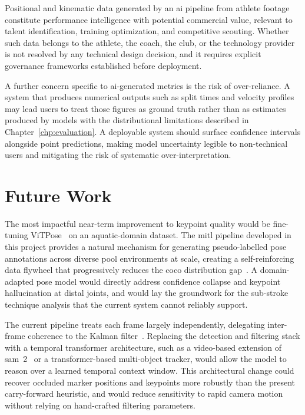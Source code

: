 Positional and kinematic data generated by an \gls{ai} pipeline from athlete footage constitute
performance intelligence with potential commercial value, relevant to talent identification,
training optimization, and competitive scouting. Whether such data belongs to the athlete, the
coach, the club, or the technology provider is not resolved by any technical design decision, and
it requires explicit governance frameworks established before deployment.

A further concern specific to \gls{ai}-generated metrics is the risk of over-reliance. A system
that produces numerical outputs such as split times and velocity profiles may lead users to
treat those figures as ground truth rather than as estimates produced by models with the
distributional limitations described in Chapter~\ref{chp:evaluation}. A deployable system
should surface confidence intervals alongside point predictions, making model uncertainty
legible to non-technical users and mitigating the risk of systematic over-interpretation.

\section{Future Work}

The most impactful near-term improvement to keypoint quality would be fine-tuning
ViTPose~\cite{xu2022vitpose} on an aquatic-domain dataset. The \gls{mitl} pipeline developed in
this project provides a natural mechanism for generating pseudo-labelled pose annotations
across diverse pool environments at scale, creating a self-reinforcing data flywheel that
progressively reduces the \gls{coco} distribution gap~\cite{lin2014microsoft}. A domain-adapted
pose model would directly address confidence collapse and keypoint hallucination at distal
joints, and would lay the groundwork for the sub-stroke technique analysis that the current
system cannot reliably support.

The current pipeline treats each frame largely independently, delegating inter-frame coherence
to the Kalman filter~\cite{kalman1960new}. Replacing the detection and filtering stack with a
temporal transformer architecture, such as a video-based extension of \gls{sam}~2~\cite{ravi2024sam}
or a transformer-based multi-object tracker, would allow the model to reason over a learned
temporal context window. This architectural change could recover occluded marker positions and
keypoints more robustly than the present carry-forward heuristic, and would reduce sensitivity
to rapid camera motion without relying on hand-crafted filtering parameters.


